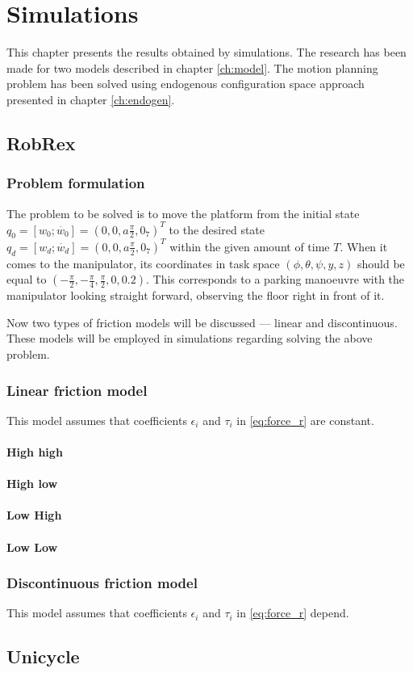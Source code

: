 \chapter{Simulations}
This chapter presents the results obtained by simulations. The research has been made for two models
described in chapter \ref{ch:model}. The motion planning problem has been solved using endogenous
configuration space approach presented in chapter \ref{ch:endogen}.
\section{RobRex}
\subsection{Problem formulation}
The problem to be solved is to move the platform from the initial state
$q_0 = [w_0; \dot{w_0}] = (0, 0, a\frac{\pi}{2}, 0_7)^T$ to the desired state
$q_d = [w_d; \dot{w_d}] = (0, 0, a\frac{\pi}{2}, 0_7)^T$
within the given amount of time $T$. When it comes to the manipulator,
its coordinates in task space $(\phi, \theta, \psi, y, z) $ should be equal to
$(-\frac{\pi}{2}, -\frac{\pi}{4}, \frac{\pi}{2}, 0, 0.2)$.
This corresponds to a parking manoeuvre with the manipulator
looking straight forward, observing the floor right in front of it.

Now two types of friction models will be discussed --- linear
and discontinuous. These models will be employed in simulations
regarding solving the above problem.

\subsection{Linear friction model}
This model assumes that coefficients $\epsilon_i$ and $\tau_i$ in \eqref{eq:force_r} are constant.
\subsubsection{High high}

\subsubsection{High low}

\subsubsection{Low High}

\subsubsection{Low Low}

\subsection{Discontinuous friction model}
This model assumes that coefficients $\epsilon_i$ and $\tau_i$ in \eqref{eq:force_r} depend.
\section{Unicycle}